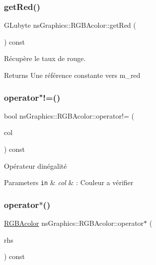 \subsubsection{\texorpdfstring{get\+Red()}{getRed()}}
{\footnotesize\ttfamily G\+Lubyte ns\+Graphics\+::\+R\+G\+B\+Acolor\+::get\+Red (\begin{DoxyParamCaption}{ }\end{DoxyParamCaption}) const}



Récupère le taux de rouge. 

\begin{DoxyReturn}{Returns}
Une référence constante vers m\+\_\+red 
\end{DoxyReturn}
\mbox{\label{classns_graphics_1_1_r_g_b_acolor_a2cf7ff27443450c18368d521546f4e9e}} 
\subsubsection{\texorpdfstring{operator"!=()}{operator!=()}}
{\footnotesize\ttfamily bool ns\+Graphics\+::\+R\+G\+B\+Acolor\+::operator!= (\begin{DoxyParamCaption}\item[{const \hyperlink{classns_graphics_1_1_r_g_b_acolor}{R\+G\+B\+Acolor} \&}]{col }\end{DoxyParamCaption}) const}



Opérateur d\textquotesingle{}inégalité 


\begin{DoxyParams}[1]{Parameters}
\mbox{\tt in}  & {\em col} & \+: Couleur a vérifier \\
\hline
\end{DoxyParams}
\mbox{\label{classns_graphics_1_1_r_g_b_acolor_a1be35bff76dd3859cc714b87db0a1193}} 
\subsubsection{\texorpdfstring{operator$\ast$()}{operator*()}}
{\footnotesize\ttfamily \hyperlink{classns_graphics_1_1_r_g_b_acolor}{R\+G\+B\+Acolor} ns\+Graphics\+::\+R\+G\+B\+Acolor\+::operator$\ast$ (\begin{DoxyParamCaption}\item[{const float \&}]{rhs }\end{DoxyParamCaption}) const}



